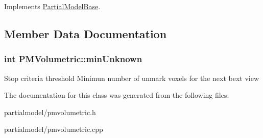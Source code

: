 Implements \hyperlink{classPartialModelBase}{Partial\+Model\+Base}.



\subsection{Member Data Documentation}
\subsubsection[{\texorpdfstring{min\+Unknown}{minUnknown}}]{\setlength{\rightskip}{0pt plus 5cm}int P\+M\+Volumetric\+::min\+Unknown\hspace{0.3cm}{\ttfamily [protected]}}\hypertarget{classPMVolumetric_aa5b2eec9334daa96bb23677c28b7642a}{}\label{classPMVolumetric_aa5b2eec9334daa96bb23677c28b7642a}
Stop criteria threshold Minimun number of unmark voxels for the next bext view 

The documentation for this class was generated from the following files\+:\begin{DoxyCompactItemize}
\item 
partialmodel/pmvolumetric.\+h\item 
partialmodel/pmvolumetric.\+cpp\end{DoxyCompactItemize}
